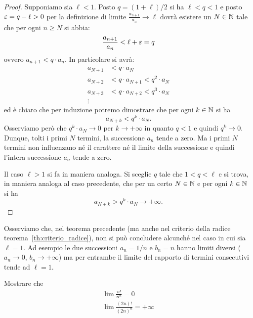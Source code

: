 \begin{proof}
Supponiamo sia $\ell<1$. Posto $q=(1+\ell)/2$ si ha $\ell < q < 1$ 
e posto $\varepsilon=q-\ell>0$ per la definizione di limite $\frac{a_{n+1}}{a_n}\to \ell$ 
dovrà esistere un $N\in {\mathbb N}$ tale
che per ogni $n\ge N$ si abbia:
\[
  \frac{a_{n+1}}{a_n} < \ell + \varepsilon = q
\]
ovvero $a_{n+1} < q \cdot a_n$. In particolare si avrà:
\begin{align*}
  a_{N+1} &< q \cdot a_N \\
  a_{N+2} &< q \cdot a_{N+1} < q^2\cdot a_N \\
  a_{N+3} &< q \cdot a_{N+2} < q^3\cdot a_N \\
  \vdots
\end{align*}
ed è chiaro che per induzione potremo dimostrare che per
ogni $k\in {\mathbb N}$ si ha
\[
  a_{N+k} < q^k\cdot a_N.
\]
Osserviamo però che $q^k \cdot a_N \to 0$ per $k\to +\infty$
in quanto $q<1$ e quindi $q^k \to 0$. 
Dunque, tolti i primi $N$ termini, la successione $a_n$ tende a zero. 
Ma i primi $N$ termini non influenzano né il carattere né il limite 
della successione e quindi l'intera successione $a_n$ tende a zero.

Il caso $\ell>1$ si fa in maniera analoga. Si sceglie $q$ tale
che $1<q<\ell$ e si trova, in maniera analoga al caso precedente,
che per un certo $N\in {\mathbb N}$ e per ogni $k\in {\mathbb N}$ si ha
\[
  a_{N+k} > q^k \cdot a_N \to +\infty.
\]
\end{proof}

Osserviamo che, nel teorema precedente (ma anche nel criterio della radice teorema~\ref{th:criterio_radice}),
non si può concludere alcunché nel
caso in cui sia $\ell = 1$.
Ad esempio le due successioni $a_n = 1/n$ e $b_n = n$
hanno limiti diversi ($a_n \to 0$, $b_n\to +\infty$) ma per entrambe
il limite del rapporto di termini consecutivi tende ad $\ell=1$.

\begin{exercise}
Mostrare che
\begin{gather*}
  \lim \frac{n!}{n^n} = 0 \\
  \lim \frac{(2n)!}{(2n)^n} = +\infty
\end{gather*}
\end{exercise}

